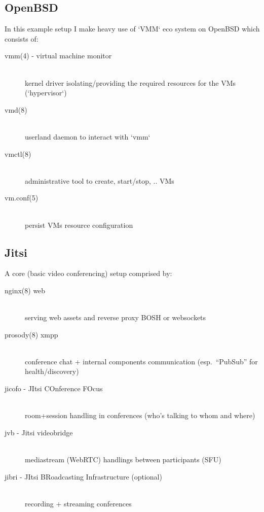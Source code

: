 \documentclass[10pt,conference]{IEEEtran}
\begin{document}
\subsection{OpenBSD}
In this example setup I make heavy use of `VMM` eco system on OpenBSD which consists of:
\begin{description}
\item[vmm(4) - virtual machine monitor] \hfill \\
	kernel driver isolating/providing the required resources for the VMs (`hypervisor`)
\item[vmd(8)] \hfill \\
	userland daemon to interact with `vmm`
\item[vmctl(8)]  \hfill \\
	administrative tool to create, start/stop, .. VMs
\item[vm.conf(5)]  \hfill \\
	persist VMs resource configuration
\end{description}

\subsection{Jitsi}
A core (basic video conferencing) setup comprised by:
\begin{description}
\item[nginx(8) web] \hfill \\
	serving web assets and reverse proxy BOSH or websockets
\item[prosody(8) xmpp] \hfill \\
	conference chat + internal components communication (esp. “PubSub” for health/discovery)
\item[jicofo - JItsi COnference FOcus] \hfill \\
	room+session handling in conferences (who’s talking to whom and where)
\item[jvb - Jitsi videobridge] \hfill \\
	mediastream (WebRTC) handlings between participants (SFU)
\item[jibri - JItsi BRoadcasting Infrastructure (optional)] \hfill \\
	recording + streaming conferences
\end{description}
\end{document}
